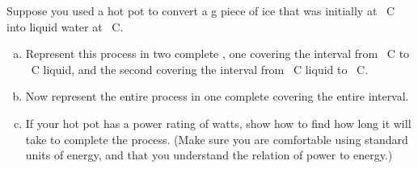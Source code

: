 \label{FNT1.2.1-3}

Suppose you used a hot pot to convert a \unit[150]{g} piece of ice that was initially at \unit[-15]{\textdegree C} into liquid water at \unit[50]{\textdegree C}.

\begin{enumerate}[(a)]
	\item Represent this process in two complete \EnergyDiagrams{}, one covering the interval from \unit[-15]{\textdegree C} to \unit[0]{\textdegree C} liquid, and the second covering the interval from \unit[0]{\textdegree C} liquid to \unit[50]{\textdegree C}.
	\item Now represent the entire process in one complete \EnergyDiagram{} covering the entire interval.
	\item If your hot pot has a power rating of \unit[600]{watts}, show how to find how long it will take to complete the process. (Make sure you are comfortable using standard units of energy, and that you understand the relation of power to energy.)
\end{enumerate}